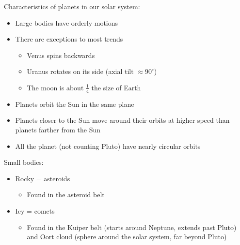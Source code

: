 \documentclass[12pt]{article}
\begin{document}
Characteristics of planets in our solar system:
\begin{itemize}
\item Large bodies have orderly motions
\item There are exceptions to most trends
\begin{itemize}
\item Venus spins backwards
\item Uranus rotates on its side (axial tilt $\approx 90^\circ$)
\item The moon is about $\frac{1}{4}$ the size of Earth
\end{itemize}
\item Planets orbit the Sun in the same plane
\item Planets closer to the Sun move  around their orbits at higher speed than planets farther from the Sun
\item All the planet (not counting Pluto) have nearly circular orbits
\end{itemize}

Small bodies:
\begin{itemize}
\item Rocky = asteroids
\begin{itemize}
\item Found in the asteroid belt
\end{itemize}
\item Icy = comets
\begin{itemize}
\item Found in the Kuiper belt (starts around Neptune, extends past Pluto) and Oort cloud (sphere around the solar system, far beyond Pluto)
\end{itemize}
\end{itemize}
\end{document}
